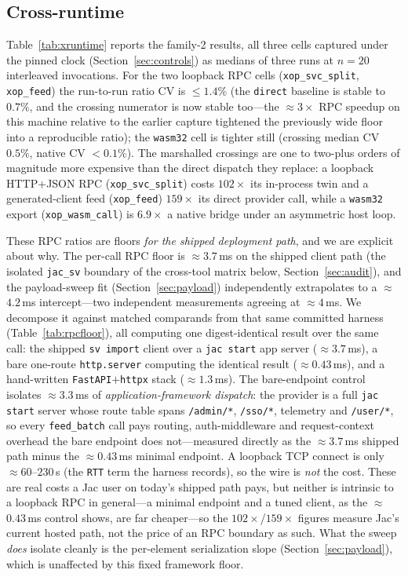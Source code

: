 \documentclass[conference]{IEEEtran}
\newcommand{\code}[1]{\texttt{#1}}
\begin{document}
\subsection{Cross-runtime}

Table~\ref{tab:xruntime} reports the family-2 results, all three cells
captured under the pinned clock (Section~\ref{sec:controls}) as medians of three
runs at $n{=}20$ interleaved invocations. For the two loopback RPC cells (\code{xop\_svc\_split},
\code{xop\_feed}) the run-to-run ratio CV is $\le$$1.4\%$ (the \code{direct}
baseline is stable to $0.7\%$, and the crossing numerator is now stable too---the
$\approx$$3\times$ RPC speedup on this machine relative to the earlier capture
tightened the previously wide floor into a reproducible ratio); the \code{wasm32}
cell is tighter still (crossing median CV $0.5\%$, native CV $<$$0.1\%$). The
marshalled crossings are one to two-plus
orders of magnitude more expensive than the direct dispatch they replace: a
loopback HTTP+JSON RPC (\code{xop\_svc\_split}) costs $102\times$ its in-process
twin and a generated-client feed (\code{xop\_feed}) $159\times$ its direct
provider call, while a \code{wasm32} export (\code{xop\_wasm\_call}) is
$6.9\times$ a native bridge under an asymmetric host loop.

These RPC ratios are floors \emph{for the shipped deployment path}, and we are
explicit about why. The per-call RPC floor is $\approx$$3.7$\,ms on the shipped
client path (the isolated \code{jac\_sv} boundary of the cross-tool matrix below,
Section~\ref{sec:audit}), and the payload-sweep fit (Section~\ref{sec:payload})
independently extrapolates to a $\approx$$4.2$\,ms intercept---two independent
measurements agreeing at $\approx$$4$\,ms. We decompose it against matched
comparands from that same committed harness (Table~\ref{tab:rpcfloor}), all
computing one digest-identical result over the same call: the shipped
\code{sv~import} client over a \code{jac start} app server ($\approx$$3.7$\,ms),
a bare one-route \code{http.server} computing the identical result
($\approx$$0.43$\,ms), and a hand-written \code{FastAPI}$+$\code{httpx} stack
($\approx$$1.3$\,ms). The bare-endpoint control isolates $\approx$$3.3$\,ms of
\emph{application-framework dispatch}: the provider is
a full \code{jac start} server whose route table spans \code{/admin/*},
\code{/sso/*}, telemetry and \code{/user/*}, so every \code{feed\_batch} call
pays routing, auth-middleware and request-context overhead the bare endpoint does
not---measured directly as the $\approx$$3.7$\,ms shipped path minus the
$\approx$$0.43$\,ms minimal endpoint. A loopback TCP connect is only
$\approx$$60$--$230$\,\textmu s (the \code{RTT} term the harness records), so the
wire is \emph{not} the cost. These are real costs a Jac user on today's
shipped path pays, but neither is intrinsic to a loopback RPC in general---a
minimal endpoint and a tuned client, as the $\approx$$0.43$\,ms control shows, are
far cheaper---so the $102\times$/$159\times$ figures measure Jac's current hosted
path, not the price of an RPC boundary as such. What the sweep \emph{does} isolate
cleanly is the per-element serialization slope (Section~\ref{sec:payload}), which
is unaffected by this fixed framework floor.
\end{document}
